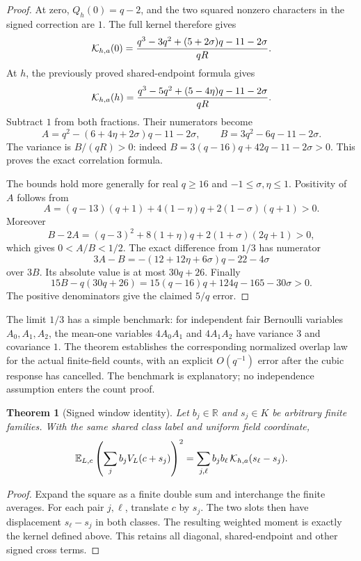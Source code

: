 \documentclass[11pt]{article}
\newtheorem{theorem}{Theorem}[section]
\begin{document}
\begin{proof}
At zero, \(Q_h(0)=q-2\), and the two squared nonzero characters in
the signed correction are \(1\). The full kernel therefore gives
\[
 {\cal K}_{h,a}(0)
  =\frac{q^3-3q^2+(5+2\sigma)q-11-2\sigma}{qR}.
\]
At \(h\), the previously proved shared-endpoint formula gives
\[
 {\cal K}_{h,a}(h)
  =\frac{q^3-5q^2+(5-4\eta)q-11-2\sigma}{qR}.
\]
Subtract \(1\) from both fractions. Their numerators become
\[
 A=q^2-(6+4\eta+2\sigma)q-11-2\sigma,\qquad
 B=3q^2-6q-11-2\sigma.
\]
The variance is \(B/(qR)>0\): indeed
\(B=3(q-16)q+42q-11-2\sigma>0\).
This proves the exact correlation formula.

The bounds hold more generally for real \(q\ge16\) and
\(-1\le\sigma,\eta\le1\). Positivity of \(A\) follows from
\[
 A=(q-13)(q+1)+4(1-\eta)q+2(1-\sigma)(q+1)>0.
\]
Moreover
\[
 B-2A=(q-3)^2+8(1+\eta)q+2(1+\sigma)(2q+1)>0,
\]
which gives \(0<A/B<1/2\).
The exact difference from \(1/3\) has numerator
\[
 3A-B=-(12+12\eta+6\sigma)q-22-4\sigma
\]
over \(3B\). Its absolute value is at most \(30q+26\).
Finally
\[
 15B-q(30q+26)
 =15(q-16)q+124q-165-30\sigma>0.
\]
The positive denominators give the claimed \(5/q\) error.
\end{proof}

The limit \(1/3\) has a simple benchmark: for independent fair Bernoulli
variables \(A_0,A_1,A_2\), the mean-one variables \(4A_0A_1\) and
\(4A_1A_2\) have variance \(3\) and covariance \(1\).
The theorem establishes the corresponding normalized overlap law for the
actual finite-field counts, with an explicit \(O(q^{-1})\) error after
the cubic response has cancelled. The benchmark is explanatory;
no independence assumption enters the count proof.

\begin{theorem}[Signed window identity]
Let \(b_j\in\mathbb R\) and \(s_j\in K\) be arbitrary finite families.
With the same shared class label and uniform field coordinate,
\[
 {\mathbb E}_{L,c}
  \left(\sum_j b_j V_L(c+s_j)\right)^2
 =\sum_{j,\ell}b_jb_\ell\,{\cal K}_{h,a}(s_\ell-s_j).
\]
\end{theorem}
\begin{proof}
Expand the square as a finite double sum and interchange the finite
averages. For each pair \(j,\ell\), translate \(c\) by \(s_j\).
The two slots then have displacement \(s_\ell-s_j\) in both classes.
The resulting weighted moment is exactly the kernel defined above.
This retains all diagonal, shared-endpoint and other signed cross terms.
\end{proof}
\end{document}
